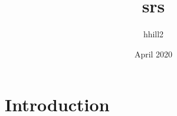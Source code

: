 \documentclass{article}
\title{srs}
\author{hhill2 }
\date{April 2020}
\begin{document}
\maketitle

\section{Introduction}
\end{document}
